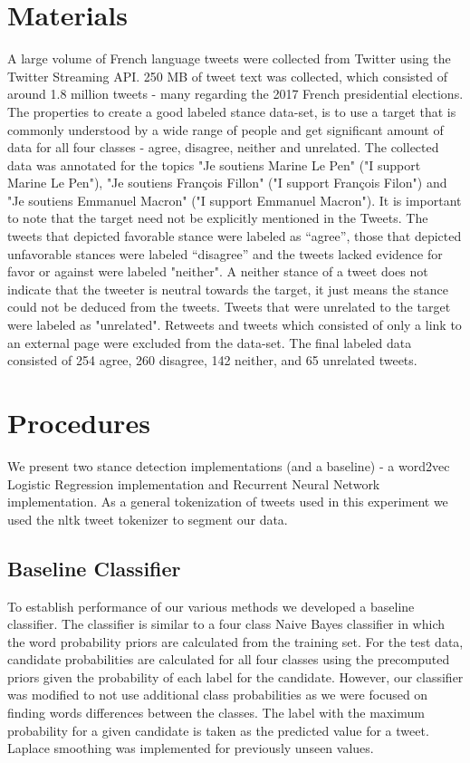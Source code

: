 \documentclass[journal]{IEEEtran}
\begin{document}
\pagebreak

\section{Materials}
A large volume of French language tweets were collected from Twitter using the Twitter Streaming API. 250 MB of tweet text was collected, which consisted of around 1.8 million tweets - many regarding the 2017 French presidential elections. The properties to create a good labeled stance data-set, is to use a target that is commonly understood by a wide range of people and get significant amount of data for all four classes - agree, disagree, neither and unrelated. The collected data was annotated for the topics "Je soutiens Marine Le Pen" ("I support Marine Le Pen"), "Je soutiens Fran\c{c}ois Fillon" ("I support Fran\c{c}ois Filon") and "Je soutiens Emmanuel Macron" ("I support Emmanuel Macron"). It is important to note that the target need not be explicitly mentioned in the Tweets. The tweets that depicted favorable stance were labeled as “agree”, those that depicted unfavorable stances were labeled “disagree” and the tweets lacked evidence for favor or against were labeled "neither". A neither stance of a tweet does not indicate that the tweeter is neutral towards the target, it just means the stance could not be deduced from the tweets. Tweets that were unrelated to the target were labeled as "unrelated". Retweets and tweets which consisted of only a link to an external page were excluded from the data-set. The final labeled data consisted of 254 agree, 260 disagree, 142 neither, and 65 unrelated tweets.

\pagebreak

\section{Procedures}
We present two stance detection implementations (and a baseline) - a word2vec Logistic Regression implementation and Recurrent Neural Network implementation. As a general tokenization of tweets used in this experiment we used the nltk tweet tokenizer to segment our data. 

\subsection{Baseline Classifier} 
To establish performance of our various methods we developed a baseline classifier. The classifier is similar to a four class Naive Bayes classifier in which the word probability priors are calculated from the training set. For the test data, candidate probabilities are calculated for all four classes using the precomputed priors given the probability of each label for the candidate. However, our classifier was modified to not use additional class probabilities as we were focused on finding words differences between the classes. The label with the maximum probability for a given candidate is taken as the predicted value for a tweet. Laplace smoothing was implemented for previously unseen values. 
\end{document}
